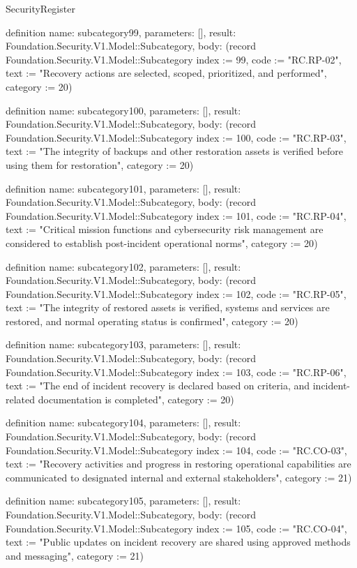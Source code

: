 \begin{lexlean}{SecurityRegister}
\begin{semanticmodule}
definition{
  name: subcategory99,
  parameters: [],
  result: Foundation.Security.V1.Model::Subcategory,
  body: (record Foundation.Security.V1.Model::Subcategory {index := 99, code := "RC.RP-02", text := "Recovery actions are selected, scoped, prioritized, and performed", category := 20})
}

definition{
  name: subcategory100,
  parameters: [],
  result: Foundation.Security.V1.Model::Subcategory,
  body: (record Foundation.Security.V1.Model::Subcategory {index := 100, code := "RC.RP-03", text := "The integrity of backups and other restoration assets is verified before using them for restoration", category := 20})
}

definition{
  name: subcategory101,
  parameters: [],
  result: Foundation.Security.V1.Model::Subcategory,
  body: (record Foundation.Security.V1.Model::Subcategory {index := 101, code := "RC.RP-04", text := "Critical mission functions and cybersecurity risk management are considered to establish post-incident operational norms", category := 20})
}

definition{
  name: subcategory102,
  parameters: [],
  result: Foundation.Security.V1.Model::Subcategory,
  body: (record Foundation.Security.V1.Model::Subcategory {index := 102, code := "RC.RP-05", text := "The integrity of restored assets is verified, systems and services are restored, and normal operating status is confirmed", category := 20})
}

definition{
  name: subcategory103,
  parameters: [],
  result: Foundation.Security.V1.Model::Subcategory,
  body: (record Foundation.Security.V1.Model::Subcategory {index := 103, code := "RC.RP-06", text := "The end of incident recovery is declared based on criteria, and incident-related documentation is completed", category := 20})
}

definition{
  name: subcategory104,
  parameters: [],
  result: Foundation.Security.V1.Model::Subcategory,
  body: (record Foundation.Security.V1.Model::Subcategory {index := 104, code := "RC.CO-03", text := "Recovery activities and progress in restoring operational capabilities are communicated to designated internal and external stakeholders", category := 21})
}

definition{
  name: subcategory105,
  parameters: [],
  result: Foundation.Security.V1.Model::Subcategory,
  body: (record Foundation.Security.V1.Model::Subcategory {index := 105, code := "RC.CO-04", text := "Public updates on incident recovery are shared using approved methods and messaging", category := 21})
}


\end{semanticmodule}
\end{lexlean}
